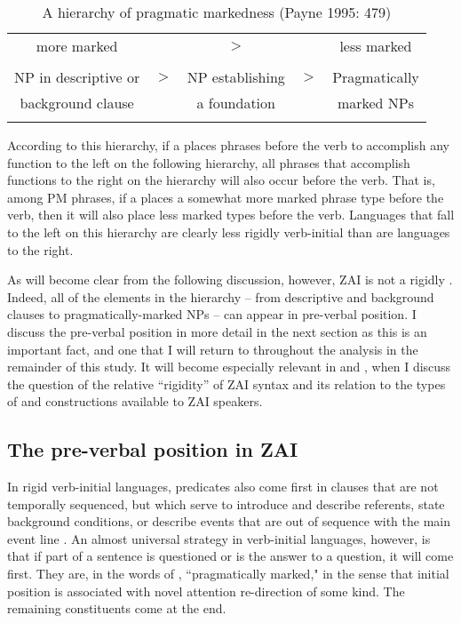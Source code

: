 \singlespacing
\begin{table}

\begin{tabular}{ c c c c c }
\midrule
more marked & & $>$ & & less marked \\
 & & &  & \\
NP in descriptive or &  $>$ & NP establishing & $>$ & Pragmatically  \\
background clause &  & a foundation &  &  marked NPs \\

\lspbottomrule
\end{tabular}\caption{{A hierarchy of pragmatic markedness (Payne 1995: 479)}}
\label{pragmaticmarkednesstable}

\end{table} 
According to this hierarchy, if a  places phrases before the verb to accomplish any function to the left on the following hierarchy, all phrases that accomplish functions to the right on the hierarchy will also occur before the verb. That is, among PM phrases, if a  places a somewhat more marked phrase type before the verb, then it will also place less marked types before the verb. Languages that fall to the left on this hierarchy are clearly less rigidly verb-initial than are languages to the right.

As will become clear from the following discussion, however, ZAI is not a rigidly . Indeed, all of the elements in the hierarchy -- from descriptive and background clauses to pragmatically-marked NPs -- can appear in pre-verbal position. I discuss the pre-verbal position in more detail in the next section as this is an important fact, and one that I will return to throughout the analysis in the remainder of this study. It will become especially relevant in  and , when I discuss the question of the relative ``rigidity'' of ZAI syntax and its relation to the types of  and  constructions available to ZAI speakers. 


\subsection{The pre-verbal position in ZAI}\label{pre-verbalpos}

In rigid verb-initial languages, predicates also come first in clauses that are not temporally sequenced, but which serve to introduce and describe referents, state background conditions, or describe events that are out of sequence with the main event line \citep[454]{payne1995}. An almost universal strategy in verb-initial languages, however, is that if part of a sentence is questioned or is the answer to a question, it will come first. They are, in the words of \citet{payne1995}, ``pragmatically marked," in the sense that initial position is associated with novel attention re-direction of some kind. The remaining constituents come at the end. 

